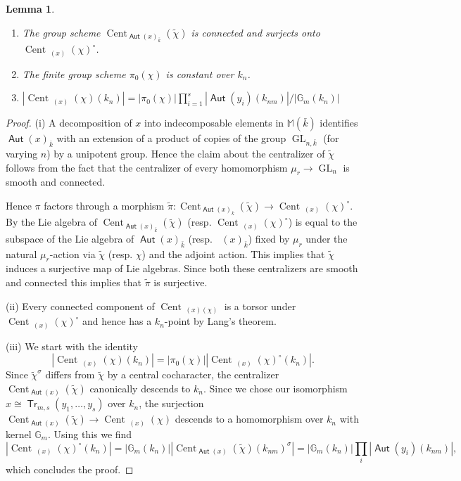 \documentclass{article}
\DeclareMathOperator{\Aut}{\mathsf{Aut}}
\DeclareMathOperator{\uAut}{\underline{\mathsf{Aut}}}
\DeclareMathOperator{\GL}{GL}
\DeclareMathOperator{\Tr}{\mathsf{Tr}}
\newcommand{\BG}{{\mathbb{G}}}
\newcommand{\BM}{{\mathbb{M}}}
\DeclareMathOperator{\Cent}{Cent}
\theoremstyle{definition}
\theoremstyle{plain}
\newtheorem{lemma}[definition]{Lemma}
\begin{document}
    \begin{lemma} \label{Pi0Lemma1}
    \begin{enumerate}
        \item  The group scheme $\Cent_{\Aut(x)_{\bar k}}(\tilde \chi)$ is connected and surjects onto $\Cent_{\uAut(x)}(\chi)^\circ$.
   \item The finite group scheme $\pi_0(\chi)$ is constant over $k_n$.
        \item $|\Cent_{\uAut(x)}(\chi)(k_n)|=|\pi_0(\chi)| \prod_{i=1}^s |\Aut(y_i)(k_{nm})|/|\BG_m(k_n)|$
    \end{enumerate}       
    \end{lemma}
\begin{proof}
    (i) A decomposition of $x$ into indecomposable elements in $\BM(\bar k)$ identifies $\Aut(x)_{\bar k}$ with an extension of a product of copies of the group $\GL_{n,\bar k}$ (for varying $n$) by a unipotent group. Hence the claim about the centralizer of $\tilde\chi$ follows from the fact that the centralizer of every homomorphism $\mu_r \to \GL_n$ is smooth and connected.

    Hence $\pi$ factors through a morphism $\tilde\pi\colon \Cent_{\Aut(x)_{\bar k}}(\tilde\chi) \to \Cent_{\uAut(x)}(\chi)^\circ$. By \cite[A.8.10]{CGP} the Lie algebra of $\Cent_{\Aut(x)_{\bar k}}(\tilde\chi)$ (resp. $\Cent_{\uAut(x)}(\chi)^\circ$) is equal to the subspace of the Lie algebra of $\Aut(x)_{\bar k}$ (resp. $\uAut(x)_{\bar k}$) fixed by $\mu_r$ under the natural $\mu_r$-action via $\tilde\chi$ (resp. $\chi$) and the adjoint action. This implies that $\tilde\chi$ induces a surjective map of Lie algebras. Since both these centralizers are smooth and connected this implies that $\tilde\pi$ is surjective.
    
    (ii) Every connected component of $\Cent_{\uAut(x)(\chi)}$ is a torsor under $\Cent_{\uAut(x)}(\chi)^\circ$ and hence has a $k_n$-point by Lang's theorem.

    (iii) We start with the identity
    \begin{equation*}
        |\Cent_{\uAut(x)}(\chi)(k_n)|=|\pi_0(\chi)||\Cent_{\uAut(x)}(\chi)^\circ(k_{n})|.
    \end{equation*}
        Since $\tilde\chi^\sigma$ differs from $\tilde\chi$ by a central cocharacter, the centralizer $\Cent_{\Aut(x)}(\tilde\chi)$ canonically descends to $k_n$. Since we chose our isomorphism $x\cong \Tr_{m,s}(y_1,\hdots,y_s)$ over $k_n$, the surjection $\Cent_{\Aut(x)}(\tilde\chi) \to \Cent_{\uAut(x)}(\chi)$ descends to a homomorphism over $k_n$ with kernel $\BG_m$. Using this we find
        \begin{equation*}
            |\Cent_{\uAut(x)}(\chi)^\circ(k_{n})|=|\BG_m(k_n)||\Cent_{\Aut(x)}(\tilde\chi)(k_{nm})^\sigma|=|\BG_m(k_n)| \prod_i |\Aut(y_i)(k_{nm})|,
        \end{equation*}
        which concludes the proof.
\end{proof}
\end{document}
